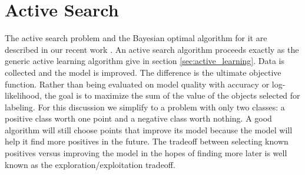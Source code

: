 \documentclass[prd,nofootbib,floatfix,11pt,tightenlines,nofootinbib]{revtex4}
\begin{document}
%

\section{Active Search}
\label{sec:active_search}

The active search problem and the Bayesian optimal algorithm for it are
described in our recent work \cite{Garnett11,Garnett12}.  An active search
algorithm proceeds exactly as the generic active learning algorithm give in
section \ref{sec:active_learning}.  Data is collected and the model is
improved.  The difference is the ultimate objective function.  Rather than
being evaluated on model quality with accuracy or log-likelihood, the goal
is to maximize the sum of the value of the objects selected for labeling.
For this discussion we simplify to a problem with only two classes: a
positive class worth one point and a negative class worth nothing.  A good
algorithm will still choose points that improve its model because the model
will help it find more positives in the future.  The tradeoff between
selecting known positives versus improving the model in the hopes of
finding more later is well known as the exploration/exploitation tradeoff.
\end{document}
